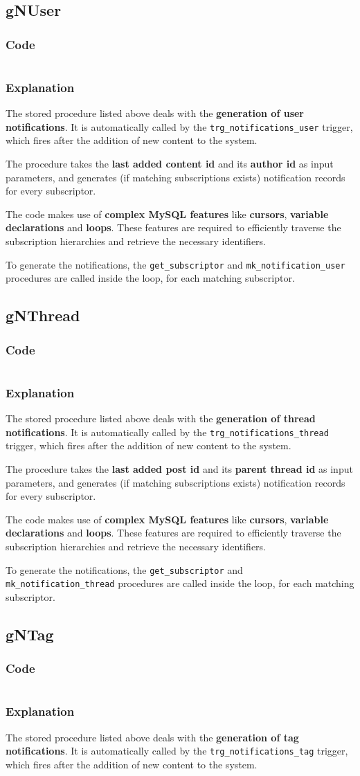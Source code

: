 \documentclass[12pt]{report}
\renewcommand\emph{\textbf}
\newcommand{\printSQLtest}[1]
{
    \inputminted[linenos, breaklines, breakbytoken, tabsize=4, fontsize=\footnotesize]{mysql}{#1}
}
\newcommand{\printSQLTablepage}[2]
{    
    \subsection{#2}
    \subsubsection{Code}
    \printSQLtest{../sql/parts/#1}
    \subsubsection{Explanation}
}
\begin{document}
                \newpage

                \printSQLTablepage{25_procGNUser.sql}{gNUser}
                    The stored procedure listed above deals with the \emph{generation of user notifications}. It is automatically called by the \texttt{trg_notifications_user} trigger, which fires after the addition of new content to the system.

                    The procedure takes the \emph{last added content id} and its \emph{author id} as input parameters, and generates (if matching subscriptions exists) notification records for every subscriptor.

                    The code makes use of \emph{complex MySQL features} like \emph{cursors}, \emph{variable declarations} and \emph{loops}.
                    These features are required to efficiently traverse the subscription hierarchies and retrieve the necessary identifiers.

                    To generate the notifications, the \texttt{get_subscriptor} and \texttt{mk_notification_user} procedures are called inside the loop, for each matching subscriptor.

                \newpage

                \printSQLTablepage{26_procGNThread.sql}{gNThread}
                    The stored procedure listed above deals with the \emph{generation of thread notifications}. It is automatically called by the \texttt{trg_notifications_thread} trigger, which fires after the addition of new content to the system.

                    The procedure takes the \emph{last added post id} and its \emph{parent thread id} as input parameters, and generates (if matching subscriptions exists) notification records for every subscriptor.

                    The code makes use of \emph{complex MySQL features} like \emph{cursors}, \emph{variable declarations} and \emph{loops}.
                    These features are required to efficiently traverse the subscription hierarchies and retrieve the necessary identifiers.

                    To generate the notifications, the \texttt{get_subscriptor} and \texttt{mk_notification_thread} procedures are called inside the loop, for each matching subscriptor.

                \newpage

                \printSQLTablepage{27_procGNTag.sql}{gNTag}
                    The stored procedure listed above deals with the \emph{generation of tag notifications}. It is automatically called by the \texttt{trg_notifications_tag} trigger, which fires after the addition of new content to the system.
\end{document}
